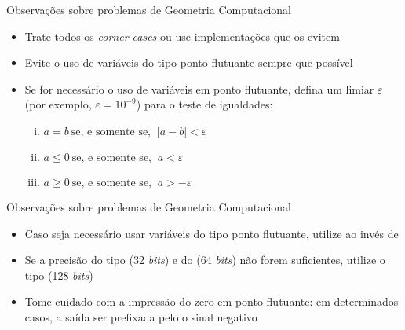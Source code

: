 \begin{frame}[fragile]{Observações sobre problemas de Geometria Computacional}

    \begin{itemize}
        \item Trate todos os \textit{corner cases} ou use implementações que os evitem
        \pause

        \item Evite o uso de variáveis do tipo ponto flutuante sempre que possível
        \pause

        \item Se for necessário o uso de variáveis em ponto flutuante, defina um limiar $\varepsilon$
        (por exemplo, $\varepsilon = 10^{-9}$) para o teste de igualdades:
        \pause


        \begin{enumerate}[i.]
            \item $a = b \ \mbox{se, e somente se, }\ |a - b| < \varepsilon$
        \pause
            \item $a \leq 0 \ \mbox{se, e somente se, }\ a < \varepsilon$
        \pause
            \item $a \geq 0 \ \mbox{se, e somente se, }\ a > -\varepsilon$
        \end{enumerate}
        \pause


    \end{itemize}

\end{frame}

\begin{frame}[fragile]{Observações sobre problemas de Geometria Computacional}

    \begin{itemize}
        \item Caso seja necessário usar variáveis do tipo ponto flutuante, utilize 
             ao invés de 
        \pause

        \item Se a precisão do tipo  (32 \textit{bits}) e do  
        (64 \textit{bits}) não forem suficientes, utilize o tipo 
        (128 \textit{bits})
        \pause

        \item Tome cuidado com a impressão do zero em ponto flutuante: em determinados casos, 
        a saída ser prefixada pelo o sinal negativo
        \pause

    \end{itemize}

\end{frame}

